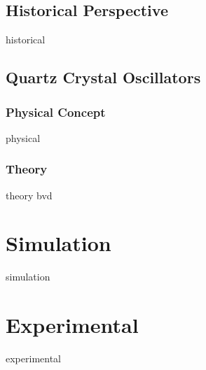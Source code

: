 \documentclass[a4paper,titlepage,onecolumn]{report}
\begin{document}
	\section{Historical Perspective}
	{historical}
	\section{Quartz Crystal Oscillators}
	\subsection{Physical Concept}
	{physical}
	\subsection{Theory}
	{theory}
	{bvd}
\chapter{Simulation}
{simulation}
\chapter{Experimental}
{experimental}

\appendix



\end{document}
